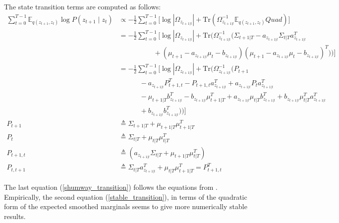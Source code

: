 \documentclass[11pt, reqno]{article}
\numberwithin{equation}{section}
\begin{document}
The state transition terms are computed as follows:
\begin{align}
\sum_{t=0}^{T-1} \mathbb{E}_{q(z_{t+1}, z_t)} \log P(z_{t+1} \mid z_t) &\propto -\frac{1}{2} \sum_{t=0}^{T-1} \Bigg[\log |\Omega_{z_{t+1|t}}| + \mathrm{Tr}\left(\Omega_{z_{t+1|t}}^{-1}\mathbb{E}_{q(z_{t+1}, z_t)} Quad \right) \Bigg] \nonumber\\
&= - \frac{1}{2} \sum_{t=0}^{T-1} \Bigg[ \log |\Omega_{z_{t+1|t}}| + \mathrm{Tr}\Bigg(\Omega_{z_{t+1|t}}^{-1}\bigg( \Sigma_{t+1|T} - a_{z_{t+1|t}}\Sigma_{t|T}a_{z_{t+1|t}}^T  \nonumber \\
&\hspace{5em} + (\mu_{t+1} - a_{z_{t+1|t}}\mu_t - b_{z_{t+1|t}})(\mu_{t+1} - a_{z_{t+1|t}}\mu_t - b_{z_{t+1|t}})^T \bigg)\Bigg)\Bigg] \label{stable_transition}\\\ 
&= - \frac{1}{2} \sum_{t=0}^{T-1} \Bigg[\log |\Omega_{z_{t+1|t}}| + \mathrm{Tr}\Bigg(\Omega_{z_{t+1|t}}^{-1}\bigg(P_{t+1}  \nonumber\\
&\hspace{3em} - a_{z_{t+1|t}}P_{t+1,t}^T - P_{t+1,t} a_{z_{t+1|t}}^T + a_{z_{t+1|t}}P_{t}a_{z_{t+1|t}}^T  \nonumber\\
&\hspace{3em} - \mu_{t+1|T}b_{z_{t+1|t}}^T - b_{z_{t+1|t}}\mu_{t+1|T}^T  + a_{z_{t+1|t}}\mu_{t|T}b_{z_{t+1|t}}^T  + b_{z_{t+1|t}}\mu_{t|T}^T a_{z_{t+1|t}}^T  \nonumber\\
&\hspace{3em} + b_{z_{t+1|t}}b_{z_{t+1|t}}^T  \bigg)\Bigg)\Bigg] \label{shumway_transition} \\
P_{t+1} &\triangleq \Sigma_{t+1|T}+\mu_{t+1|T}\mu_{t+1|T}^T \nonumber\\
P_{t} &\triangleq \Sigma_{t|T} + \mu_{t|T}\mu_{t|T}^T \nonumber\\
P_{t+1,t} &\triangleq (a_{z_{t+1|t}}\Sigma_{t|T} + \mu_{t+1|T}\mu_{t|T}^T) \nonumber\\
P_{t,t+1} &\triangleq \Sigma_{t|T}a_{z_{t+1|t}}^T + \mu_{t|T}\mu_{t+1|T}^T = P_{t+1,t}^T  \nonumber
\end{align}

The last  equation (\ref{shumway_transition}) follows the equations from \cite{Shumway1982}.  Empirically, the second equation (\ref{stable_transition}),  in terms of the quadratic form of the expected smoothed marginals seems to give more numerically stable results.   
\end{document}
